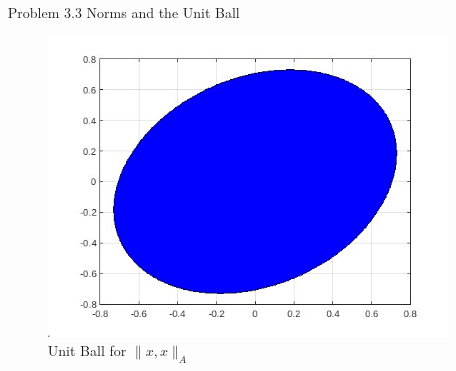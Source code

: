 \documentclass[12pt]{article}
\begin{document}
\begin{enumerate}
\begin{framed}
For $N=10$, $\alpha=\begin{bmatrix}
    1.0615 \\ -1.3347 \\ 14.8125 \\-26.4481 \\ 18.8592 \\ -6.8028 \\ 1.3448 \\ -0.1465 \\ 0.0082 \\ -0.0002
\end{bmatrix}$
\end{framed}
\newpage

Code used to solve problem 3.2:

\begin{lstlisting}[language=matlab]
N=2;

% Init empty Gram and b matrices
G = zeros(N,N);
b = zeros(N,1);

% Iterate over grammian and b and fill in inner products
for r = 1:N
    for c = 1:N
        % Calc <v_c,v_r>
        f = @(t) t.^(r-1).*t.^(c-1).*exp(-2.*t);
        G(r, c) = integral(f, 0, Inf);
    end
    % Calc <x,v_r>
    f = @(t) t.^(r-1).*exp(-t);
    b(r,1) = integral(f, 0, 1);
end

% Calculate coefficients a = G^(-1)b
a = G\b;

% Plot x and x_hat (our approximation)
t = linspace(0,2);
x = t <= 1;
x_hat = zeros(1, 100);

for n = 1:N
    x_hat = x_hat + a(n).*t.^(n-1).*exp(-t);
end
plot(t, x); hold on;
plot(t, x_hat); hold off;
title(['Plot of $$h(t)$$ and $$\hat{h}(t)$$, N=', num2str(N)], 'Interpreter', 'Latex');
legend('$$h(t)$$', '$$\hat{h}(t)$$', 'Interpreter', 'Latex');
\end{lstlisting}
\newpage

\item[Problem 3.3] Norms and the Unit Ball

\begin{figure}[h]
    \caption{Unit Ball for $\|x,x\|_A$}
    \centering
    \includegraphics[scale=0.5]{3-3.jpg}
\end{figure}


\end{enumerate}
\end{document}
